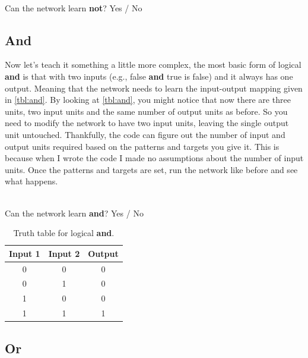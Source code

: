 \documentclass[a4paper,10pt]{article}
\begin{document}
\ \\ Can the network learn \textbf{not}?    Yes / No                                               
                                                     

\subsection{And}

Now let's teach it something a little more complex, the most basic form of logical \textbf{and} is that with two inputs (e.g., false \textbf{and} true is false) and it always has one output. Meaning that the network needs to learn the input-output mapping given in \autoref{tbl:and}. By looking at \autoref{tbl:and}, you might notice that now there are three units, two input units and the same number of output units as before. So you need to modify the network to have two input units, leaving the single output unit untouched. Thankfully, the code can figure out the number of input and output units required based on the patterns and targets you give it. This is because when I wrote the code I made no assumptions about the number of input units.
Once the patterns and targets are set, run the network like before and see what happens.

\ \\ Can the network learn \textbf{and}?    Yes / No                                             

\begin{table}[ht]
 \centering
 \begin{tabular}[t]{ccc}
Input 1 & Input 2 & Output\\ \hline
0 & 0 & 0\\
0 & 1 & 0 \\
1 & 0 & 0 \\
1 & 1 & 1 \\

\end{tabular} \caption{Truth table for logical \textbf{and}.}
 \label{tbl:and}
\end{table}

\subsection{Or}
\end{document}

